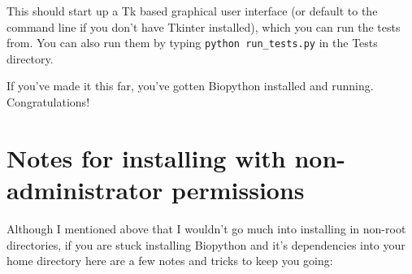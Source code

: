 \documentclass{article}
\begin{document}
This should start up a Tk based graphical user interface (or default to the command line if you don't have Tkinter installed), which you can run the tests from. You can also run them by typing \verb|python run_tests.py| in the Tests directory.

If you've made it this far, you've gotten Biopython installed and running.
Congratulations!

\section{Notes for installing with non-administrator permissions}

Although I mentioned above that I wouldn't go much into installing in
non-root directories, if you are stuck installing
Biopython and it's dependencies into your home directory here are a
few notes and tricks to keep you going:
\end{document}
